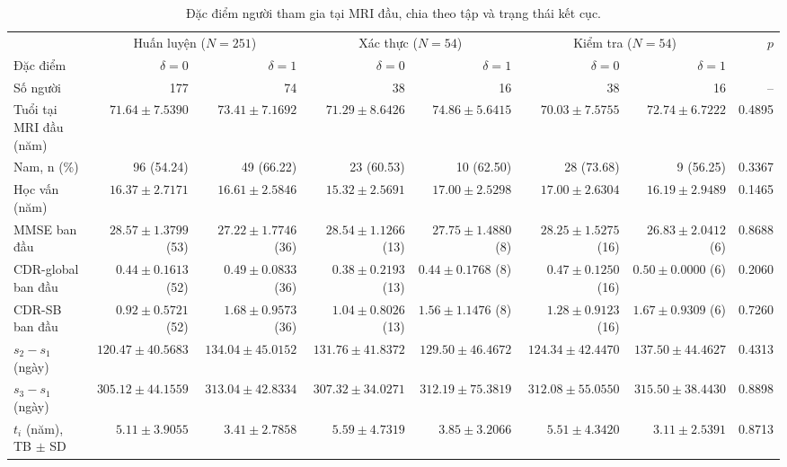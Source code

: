 \begin{landscape}
\begin{table}[p]
\centering\small
\caption[Đặc điểm người tham gia tại MRI đầu]{Đặc điểm người tham gia tại MRI đầu, chia theo tập và trạng thái kết cục.}
\label{tab:baseline-characteristics}
\setlength{\tabcolsep}{2pt}
\begin{tabular}{@{}lrrrrrrr@{}}
\toprule
& \multicolumn{2}{c}{Huấn luyện ($N=251$)} & \multicolumn{2}{c}{Xác thực ($N=54$)} & \multicolumn{2}{c}{Kiểm tra ($N=54$)} & $p$ \\
\cmidrule(lr){2-3}\cmidrule(lr){4-5}\cmidrule(lr){6-7}
Đặc điểm & $\delta=0$ & $\delta=1$ & $\delta=0$ & $\delta=1$ & $\delta=0$ & $\delta=1$ & \\
\midrule
Số người & 177 & 74 & 38 & 16 & 38 & 16 & -- \\
Tuổi tại MRI đầu (năm) & $71.64 \pm 7.5390$ & $73.41 \pm 7.1692$ & $71.29 \pm 8.6426$ & $74.86 \pm 5.6415$ & $70.03 \pm 7.5755$ & $72.74 \pm 6.7222$ & 0.4895 \\
Nam, n (\%) & 96 (54.24) & 49 (66.22) & 23 (60.53) & 10 (62.50) & 28 (73.68) & 9 (56.25) & 0.3367 \\
Học vấn (năm) & $16.37 \pm 2.7171$ & $16.61 \pm 2.5846$ & $15.32 \pm 2.5691$ & $17.00 \pm 2.5298$ & $17.00 \pm 2.6304$ & $16.19 \pm 2.9489$ & 0.1465 \\
MMSE ban đầu & $28.57 \pm 1.3799$ (53) & $27.22 \pm 1.7746$ (36) & $28.54 \pm 1.1266$ (13) & $27.75 \pm 1.4880$ (8) & $28.25 \pm 1.5275$ (16) & $26.83 \pm 2.0412$ (6) & 0.8688 \\
CDR-global ban đầu & $0.44 \pm 0.1613$ (52) & $0.49 \pm 0.0833$ (36) & $0.38 \pm 0.2193$ (13) & $0.44 \pm 0.1768$ (8) & $0.47 \pm 0.1250$ (16) & $0.50 \pm 0.0000$ (6) & 0.2060 \\
CDR-SB ban đầu & $0.92 \pm 0.5721$ (52) & $1.68 \pm 0.9573$ (36) & $1.04 \pm 0.8026$ (13) & $1.56 \pm 1.1476$ (8) & $1.28 \pm 0.9123$ (16) & $1.67 \pm 0.9309$ (6) & 0.7260 \\
$s_2-s_1$ (ngày) & $120.47 \pm 40.5683$ & $134.04 \pm 45.0152$ & $131.76 \pm 41.8372$ & $129.50 \pm 46.4672$ & $124.34 \pm 42.4470$ & $137.50 \pm 44.4627$ & 0.4313 \\
$s_3-s_1$ (ngày) & $305.12 \pm 44.1559$ & $313.04 \pm 42.8334$ & $307.32 \pm 34.0271$ & $312.19 \pm 75.3819$ & $312.08 \pm 55.0550$ & $315.50 \pm 38.4430$ & 0.8898 \\
$t_i$ (năm), TB $\pm$ SD & $5.11 \pm 3.9055$ & $3.41 \pm 2.7858$ & $5.59 \pm 4.7319$ & $3.85 \pm 3.2066$ & $5.51 \pm 4.3420$ & $3.11 \pm 2.5391$ & 0.8713 \\

\end{tabular}
\end{table}
\end{landscape}
